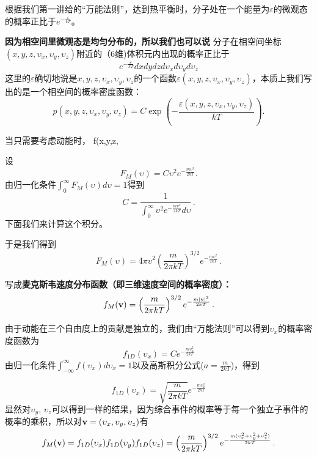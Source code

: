 \documentclass[CJK]{beamer}
\begin{document}
\begin{frame}
\bch
{\large 


  根据我们第一讲给的“万能法则”，达到热平衡时，分子处在一个能量为$\varepsilon$的微观态的概率正比于$e^{-\frac{\varepsilon}{kT}}$。

  {\bf 因为相空间里微观态是均匀分布的，所以我们也可以说} 分子在相空间坐标$(x,y,z,\upsilon_x,\upsilon_y,\upsilon_z)$附近的（6维)体积元内出现的概率正比于
$$ e^{-\frac{\varepsilon}{kT}} dx dy dz d\upsilon_x d\upsilon_y d\upsilon_z$$
  这里的$\varepsilon$确切地说是$x,y,z,\upsilon_x,\upsilon_y,\upsilon_z$的一个函数$\varepsilon(x,y,z,\upsilon_x,\upsilon_y, \upsilon_z)$，本质上我们写出的是一个相空间的概率密度函数：
  $$ p(x,y,z,\upsilon_x,\upsilon_y, \upsilon_z) = C \exp\left(-\frac{\varepsilon(x,y,z,\upsilon_x,\upsilon_y, \upsilon_z)}{kT}\right).$$

}
\ech
\end{frame}


\begin{frame}
\bch
    {\large
      当只需要考虑动能时，
      f(x,y,z,
      }
\ech
\end{frame}

\begin{frame}
\bch
设
$$F_M(\upsilon) = C \upsilon^2 e^{-\frac{m\upsilon^2}{2kT}}.$$
由归一化条件$\int_0^\infty F_M(\upsilon)d\upsilon = 1$得到
$$ C = \frac{1}{\int_0^\infty \upsilon^2 e^{-\frac{m\upsilon^2}{2kT}}d\upsilon} \, . $$
下面我们来计算这个积分。
\ech
\end{frame}


\begin{frame}
\bch
{\small
于是我们得到
$$F_M(\upsilon) = 4\pi \upsilon^2 \left(\frac{m}{2\pi kT}\right)^{3/2} e^{-\frac{m\upsilon^2}{2kT}}\,.$$

写成{\bf \blue 麦克斯韦速度分布函数（即三维速度空间的概率密度）：
$$f_M({\mathbf{v}}) = \left(\frac{m}{2\pi kT}\right)^{3/2} e^{-\frac{m|{\mathbf{v}}|^2}{2kT}}\, .$$}
}
\ech
\end{frame}

\begin{frame}
\bch
{\small
由于动能在三个自由度上的贡献是独立的，我们由“万能法则”可以得到$\upsilon_x$的概率密度函数为
$$ f_{1D}(\upsilon_x) =  C e^{-\frac{m\upsilon_x^2}{2kT}}$$
由归一化条件$\int_{-\infty}^\infty f(\upsilon_x)d\upsilon_x = 1$以及高斯积分公式($a = \frac{m}{2kT}$)，得到

$$ f_{1D}(\upsilon_x) =   \sqrt{\frac{m}{2\pi kT}} e^{-\frac{m\upsilon_x^2}{2kT}}$$
显然对$\upsilon_y$, $\upsilon_z$可以得到一样的结果，因为综合事件的概率等于每一个独立子事件的概率的乘积，所以对${\mathbf{v}} = (\upsilon_x, \upsilon_y, \upsilon_z)$有
$$f_M({\mathbf{v}}) = f_{1D}(\upsilon_x)f_{1D}(\upsilon_y)f_{1D}(\upsilon_z)=  \left(\frac{m}{2\pi kT}\right)^{3/2} e^{-\frac{m(\upsilon_x^2+\upsilon_y^2+\upsilon_z^2)}{2kT}}   \, .$$
}
\ech
\end{frame}
\end{document}
